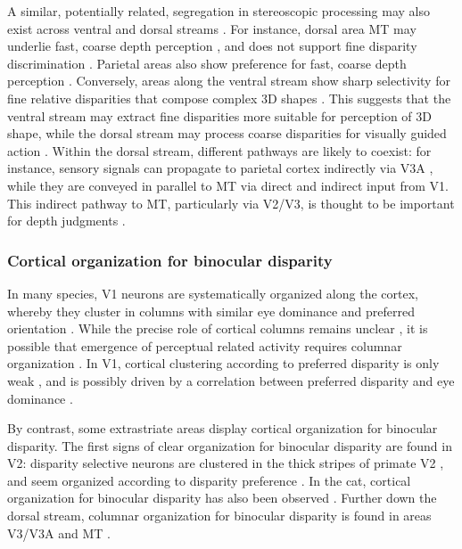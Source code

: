 A similar, potentially related, segregation in stereoscopic processing may also exist across ventral and dorsal streams \cite{Parker:2007nx}. For instance, dorsal area MT may underlie fast, coarse depth perception \cite{Uka:2003uq, Uka_2006}, and does not support fine disparity discrimination \cite{Uka_2006}. Parietal areas also show preference for fast, coarse depth perception \cite{Srivastava:2009oa}. Conversely, areas along the ventral stream show sharp selectivity for fine relative disparities that compose complex 3D shapes \cite{Watanabe:2002kx,Umeda:2007vn,Shiozaki:2012ys,Verhoef:2012dg,Janssen:2000oq,Janssen:2003fk}. This suggests that the ventral stream may extract fine disparities more suitable for perception of 3D shape, while the dorsal stream may process coarse disparities for visually guided action \cite{Parker:2007nx, Roe_Parker_Born_DeAngelis_2007}. Within the dorsal stream, different pathways are likely to coexist: for instance, sensory signals can propagate to parietal cortex indirectly via V3A \cite{Orban:2006kn}, while they are conveyed in parallel to MT via direct and indirect input from V1. This indirect pathway to MT, particularly via V2/V3, is thought to be important for depth judgments \cite{Ponce:2008km,Smolyanskaya:2015ve}.

\subsubsection{Cortical organization for binocular disparity}

In many species, V1 neurons are systematically organized along the cortex, whereby they cluster in columns with similar eye dominance and preferred orientation \cite{Hubel:1974sv,Wiesel:1974am,Hubel:1968hz,HUBEL:1962ti,Hubel:1978zt,Hubel:1969il}. While the precise role of cortical columns remains unclear \cite{Horton:2005hb}, it is possible that emergence of perceptual related activity requires columnar organization \cite{Nienborg:2014fu}. In V1, cortical clustering according to preferred disparity is only weak \cite{LeVay:1988ve,Prince:2002cr}, and is possibly driven by a correlation between preferred disparity and eye dominance \cite{Poggio:1977ys,LeVay:1988ve}.

By contrast, some extrastriate areas display cortical organization for binocular disparity. The first signs of clear organization for binocular disparity are found in V2: disparity selective neurons are clustered in the thick stripes of primate V2 \cite{Hubel:1987ly}, and seem organized according to disparity preference \cite{Hubel:1970dq, Chen:2008vn}. In the cat, cortical organization for binocular disparity has also been observed \cite{Kara:2009fk}. Further down the dorsal stream, columnar organization for binocular disparity is found in areas V3/V3A \cite{Adams:2001wt, Anzai:2011gb, Yeagle_Lafer-Sousa_Conway_2013} and MT \cite{DeAngelis:1999fk}.
 
